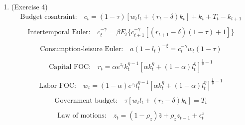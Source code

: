 \documentclass[letterpaper,12pt]{article}
\theoremstyle{definition}
\begin{document}
\begin{enumerate}
	\item(Exercise 4)\\
	\begin{equation} \label{eq1}
	\begin{split}
	\text{Budget cosntraint:} \quad c_{t} = (1 - \tau)[w_{t}l_{t} + (r_{t} - \delta)k_{t}] + k_{t} + T_{t} - k_{t + 1}\\
	\end{split}
	\end{equation}
	\begin{equation} \label{eq2}
	\begin{split}
	\text{Intertemporal Euler:} \quad c_{t}^{-\gamma} = \beta E_{t}\{  c_{t + 1}^{-\gamma}[(r_{t + 1} - \delta)(1 - \tau) + 1]\} \\
	\end{split}
	\end{equation}
	\begin{equation} \label{eq3}
	\begin{split}
	\text{Consumption-leisure Euler:} \quad a(1 - l_{t})^{-\xi} = c_{t}^{-\gamma}w_{t}(1 - \tau)\\
	\end{split}
	\end{equation}
	\begin{equation} \label{eq4}
	\begin{split}
	\text{Capital FOC:} \quad r_{t} = \alpha e^{z_{t}}k_{t}^{\eta - 1}[\alpha k_{t}^{\eta} + (1 - \alpha)l_{t}^{\eta}]^{\frac{1}{\eta} - 1} \\
	\end{split}
	\end{equation}
	\begin{equation} \label{eq5}
	\begin{split}
	\text{Labor FOC:} \quad w_{t} =  (1 - \alpha) e^{z_{t}}l_{t}^{\eta - 1}[\alpha k_{t}^{\eta} + (1 - \alpha)l_{t}^{\eta}]^{\frac{1}{\eta} - 1} \\
	\end{split}
	\end{equation}
	\begin{equation} \label{eq6}
	\begin{split}
	\text{Government budget:} \quad \tau[w_{t}l_{t} + (r_{t} - \delta)k_{t}] = T_{t}  \\
	\end{split}
	\end{equation}
	\begin{equation} \label{eq7}
	\begin{split}
	\text{Law of motions:} \quad z_{t} = (1 - \rho_{z})\bar{z} + \rho_{z}z_{t - 1} + \epsilon_{t}^{z} \\
	\end{split}
	\end{equation}


\end{enumerate}
\end{document}
